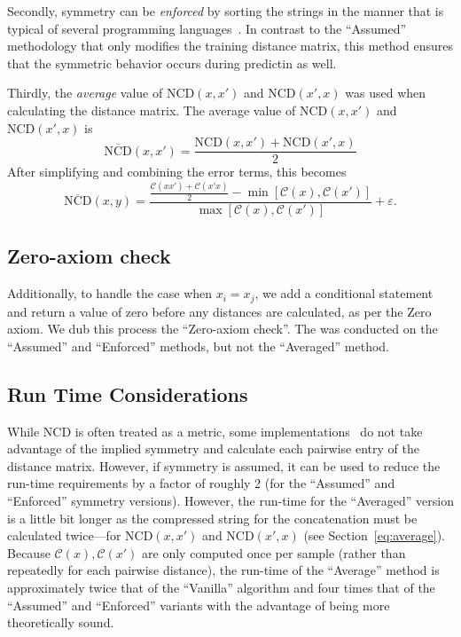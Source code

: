 \documentclass[preprint,12pt]{article}
\begin{document}
Secondly, symmetry can be \textit{enforced} by sorting the strings in the manner that is typical of several programming languages~\cite{}.
In contrast to the ``Assumed'' methodology that only modifies the training distance matrix, this method ensures that the symmetric behavior occurs during predictin as well.


Thirdly, the \textit{average} value of $\text{NCD}(x,x')$ and $\text{NCD}(x',x)$ was used when calculating the distance matrix.
The average value of $\text{NCD}(x,x')$ and $\text{NCD}(x',x)$ is
$$
    \overline{\text{NCD}}(x,x') = \frac{\text{NCD}(x,x') + \text{NCD}(x', x)}{2}
$$
After simplifying and combining the error terms, this becomes
\begin{equation}
    \overline{\text{NCD}}(x, y) = \frac{\frac{\mathcal{C}(xx') + \mathcal{C}(x'x)}{2} - \min[\mathcal{C}(x), \mathcal{C}(x')]}{\max[\mathcal{C}(x), \mathcal{C}(x')]} + \varepsilon.
\end{equation}

\subsection{Zero-axiom check }
Additionally, to handle the case when $x_i = x_j$, we add a conditional statement and return a value of zero before any distances are calculated, as per the Zero axiom. 
We dub this process the ``Zero-axiom check''. 
The was conducted on the ``Assumed'' and ``Enforced'' methods, but not the ``Averaged'' method.


\subsection{Run Time Considerations}

While NCD is often treated as a metric, some implementations~\cite{jiang2022less} do not take advantage of the implied symmetry and calculate each pairwise entry of the distance matrix.
However, if symmetry is assumed, it can be used to reduce the run-time requirements by a factor of roughly 2 (for the ``Assumed'' and ``Enforced'' symmetry versions).
However, the run-time for the ``Averaged'' version is a little bit longer as the compressed string for the concatenation must be calculated twice---for $\text{NCD}(x,x')$ and $\text{NCD}(x',x)$ (see Section~\ref{eq:average}).
Because $\mathcal{C}(x), \mathcal{C}(x')$ are only computed once per sample (rather than repeatedly for each pairwise distance), the run-time of the ``Average'' method is approximately twice that of the ``Vanilla'' algorithm and four times that of the ``Assumed'' and ``Enforced'' variants with the advantage of being more theoretically sound.
\end{document}
